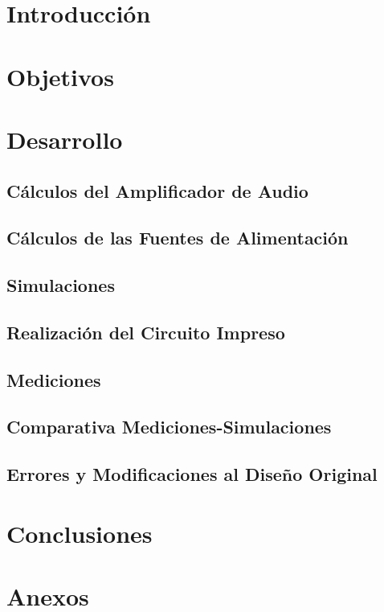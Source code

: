 \documentclass[12pt,a4paper]{article}
\begin{document}


\newpage
\thispagestyle{empty}
\tableofcontents
\newpage


\pagestyle{fancy}
\setcounter{page}{1}
\fancyfoot[R]{\thepage}



\section{Introducción}
\newpage
\section{Objetivos}

\newpage
\section{Desarrollo}

\subsection{Cálculos del Amplificador de Audio}

\subsection{Cálculos de las Fuentes de Alimentación}

\subsection{Simulaciones}

\subsection{Realización del Circuito Impreso}


\subsection{Mediciones}

\subsection{Comparativa Mediciones-Simulaciones}
\subsection{Errores y Modificaciones al Diseño Original}

\newpage
\section{Conclusiones}
\newpage
\section{Anexos}
\end{document}
